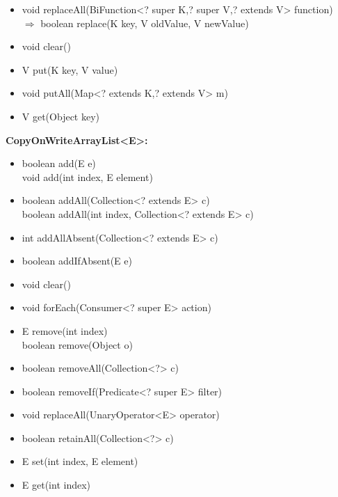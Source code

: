 \documentclass[]{usiinfthesis}
\begin{document}
{\begin{itemize}
    \mbox{}\\      boolean replace(K key, V oldValue, V newValue)
    \item   void replaceAll(BiFunction<? super K,? super V,? extends V> function)
    \mbox{}\\ $\Rightarrow$   boolean replace(K key, V oldValue, V newValue)
    \item   void clear()
    \item   V put(K key, V value)
    \item   void putAll(Map<? extends K,? extends V> m)
    \item   V get(Object key)
\end{itemize}




\noindent
\textbf{CopyOnWriteArrayList<E>:}
\begin{itemize}
    \item   boolean add(E e)
    \mbox{}\\ void add(int index, E element)
    \item   boolean addAll(Collection<? extends E> c)
    \mbox{}\\ boolean addAll(int index, Collection<? extends E> c)
    \item   int addAllAbsent(Collection<? extends E> c)
    \item   boolean addIfAbsent(E e)
    \item   void clear()
    \item   void forEach(Consumer<? super E> action)
    \item   E remove(int index)
    \mbox{}\\ boolean remove(Object o)
    \item   boolean removeAll(Collection<?> c)
    \item   boolean removeIf(Predicate<? super E> filter)
    \item   void replaceAll(UnaryOperator<E> operator)
    \item   boolean retainAll(Collection<?> c)
    \item   E set(int index, E element)
    \item   E get(int index)
\end{itemize}


}
\end{document}
